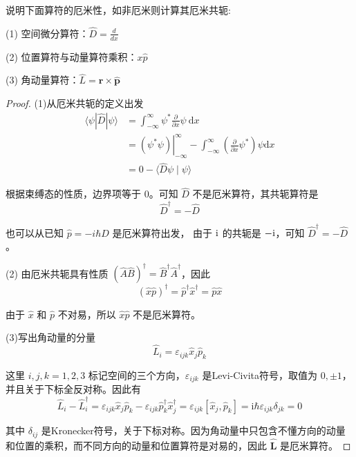 \begin{6}
说明下面算符的厄米性，如非厄米则计算其厄米共轭:

(1) 空间微分算符：$\hat{D}=\frac{d}{d x}$

(2) 位置算符与动量算符乘积：$x \hat{p}$

(3) 角动量算符：$\hat{L}=\mathbf{r} \times \hat{\mathbf{p}}$
\end{6}
\begin{proof}
    (1)从厄米共轭的定义出发
$$
\begin{aligned}
\langle\psi| \hat{D}|\psi\rangle & =\int_{-\infty}^{\infty} \psi^{*} \frac{\partial}{\partial x} \psi \mathrm{~d} x \\
& =\left.\left(\psi^{*} \psi\right)\right|_{-\infty} ^{\infty}-\int_{-\infty}^{\infty}\left(\frac{\partial}{\partial x} \psi^{*}\right) \psi \mathrm{d} x \\
& =0-\langle\hat{D} \psi \mid \psi\rangle
\end{aligned}
$$

根据束缚态的性质，边界项等于 $0$。可知 $\hat{D}$ 不是厄米算符，其共轭算符是
$$\hat{D}^{\dagger}=-\hat{D}$$

也可以从已知 $\hat{p}=-i \hbar \hat{D}$ 是厄米算符出发，
由于 ${\rm i}$ 的共轭是 $-{\rm i}$，可知 $\hat{D}^{\dagger}=-\hat{D}$。


(2)
由厄米共轭具有性质 $(\hat{A} \hat{B})^{\dagger}=\hat{B}^{\dagger} \hat{A}^{\dagger}$，因此
$$(\hat{x} \hat{p})^{\dagger}
=\hat{p}^{\dagger} \hat{x}^{\dagger}=\hat{p} \hat{x}$$

由于 $\hat{x}$ 和 $\hat{p}$ 不对易，所以 $\hat{x} \hat{p}$ 不是厄米算符。

(3)写出角动量的分量
$$\hat{L}_{i}=\varepsilon_{i j k} \hat{x}_{j} \hat{p}_{k}$$

这里 $i, j, k=1,2,3$ 标记空间的三个方向，$\varepsilon_{i j k}$ 是Levi-Civita符号，取值为 $0, \pm 1$，并且关于下标全反对称。因此有
$$\hat{L}_{i}-\hat{L}_{i}^{\dagger}=\varepsilon_{i j k} \hat{x}_{j} \hat{p}_{k}
-\varepsilon_{i j k} \hat{p}_{k}^{\dagger} \hat{x}_{j}^{\dagger}
=\varepsilon_{i j k}\left[\hat{x}_{j}, \hat{p}_{k}\right]
=\mathrm{i} \hbar \varepsilon_{i j k} \delta_{j k}=0$$

其中 $\delta_{i j}$ 是Kronecker符号，关于下标对称。因为角动量中只包含不懂方向的动量和位置的乘积，而不同方向的动量和位置算符是对易的，因此 $\hat{\mathbf{L}}$ 是厄米算符。
\end{proof}

